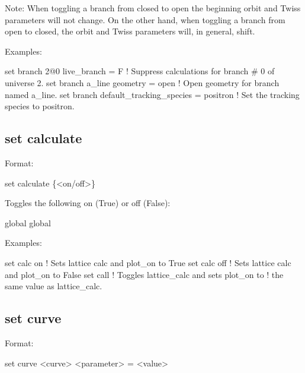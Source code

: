 {{Note: When toggling a branch from closed to open the beginning orbit and Twiss parameters will not
change. On the other hand, when toggling a branch from open to closed, the orbit and Twiss
parameters will, in general, shift.

Examples:
\begin{example}
  set branch 2@0 live_branch = F     ! Suppress calculations for branch \# 0 of universe 2.
  set branch a_line geometry = open  ! Open geometry for branch named a_line.
  set branch default_tracking_species = positron
                                     ! Set the tracking species to positron.
\end{example}


\subsection{set calculate}
\label{s:set.calc}

Format:
\begin{example}
  set calculate \{<on/off>\}
\end{example}

Toggles the following on (True) or off (False):
\begin{example}
  global%
  global%
\end{example}

Examples:
\begin{example}
  set calc on    ! Sets lattice calc and plot_on to True
  set calc off   ! Sets lattice calc and plot_on to False
  set call       ! Toggles lattice_calc and sets plot_on to
                 !  the same value as lattice_calc.
\end{example}


\subsection{set curve}
\label{s:set.curve}

Format:
\begin{example}
  set curve <curve> <parameter> = <value>
\end{example}

}}
